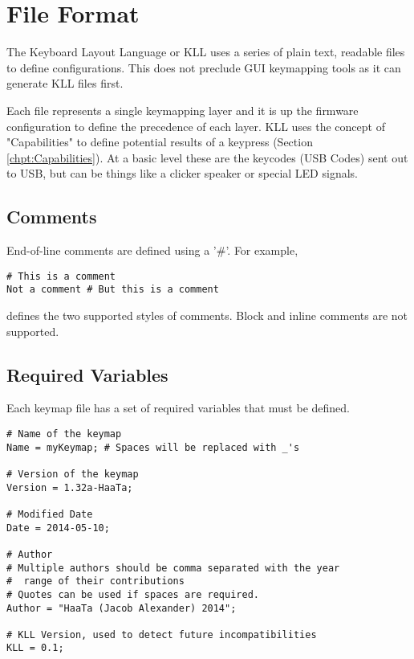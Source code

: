 \documentclass{kiibohd-template}
\begin{document}
\chapter{File Format}

The Keyboard Layout Language or KLL uses a series of plain text, readable files to define configurations.
This does not preclude GUI keymapping tools as it can generate KLL files first.

Each file represents a single keymapping layer and it is up the firmware configuration to define the precedence of each layer.
KLL uses the concept of "Capabilities" to define potential results of a keypress (Section \ref{chpt:Capabilities}).
At a basic level these are the keycodes (USB Codes) sent out to USB, but can be things like a clicker speaker or special LED signals.


\section{Comments}

End-of-line comments are defined using a '\#'.
For example,

\begin{lstlisting}
# This is a comment
Not a comment # But this is a comment
\end{lstlisting}

defines the two supported styles of comments.
Block and inline comments are not supported.


\section{Required Variables}

Each keymap file has a set of required variables that must be defined.

\begin{lstlisting}
# Name of the keymap
Name = myKeymap; # Spaces will be replaced with _'s

# Version of the keymap
Version = 1.32a-HaaTa;

# Modified Date
Date = 2014-05-10;

# Author
# Multiple authors should be comma separated with the year
#  range of their contributions
# Quotes can be used if spaces are required.
Author = "HaaTa (Jacob Alexander) 2014";

# KLL Version, used to detect future incompatibilities
KLL = 0.1;
\end{lstlisting}
\end{document}
